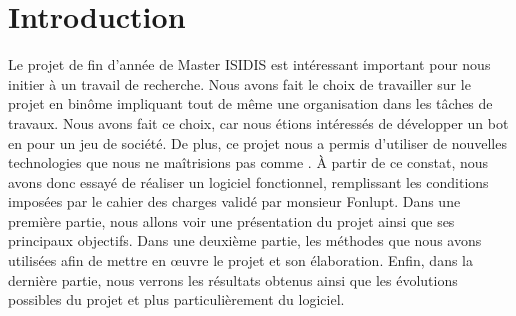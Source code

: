 \section{Introduction}
Le projet de fin d'année de Master ISIDIS est intéressant important pour nous initier à un travail de recherche.
Nous avons fait le choix de travailler sur le projet \himalaya en binôme impliquant tout de même une organisation dans les tâches de travaux.
Nous avons fait ce choix, car nous étions intéressés de développer un bot en \java pour un jeu de société.
De plus, ce projet nous a permis d’utiliser de nouvelles technologies que nous ne maîtrisions pas comme \fx.
À partir de ce constat, nous avons donc essayé de réaliser un logiciel fonctionnel, remplissant les conditions imposées par le cahier des charges validé par monsieur Fonlupt. Dans une première partie, nous allons voir une présentation du projet ainsi que ses principaux objectifs. Dans une deuxième partie, les méthodes que nous avons utilisées afin de mettre en \oe uvre le projet et son élaboration. Enfin, dans la dernière partie, nous verrons les résultats obtenus ainsi que les évolutions possibles du projet et plus particulièrement du logiciel.